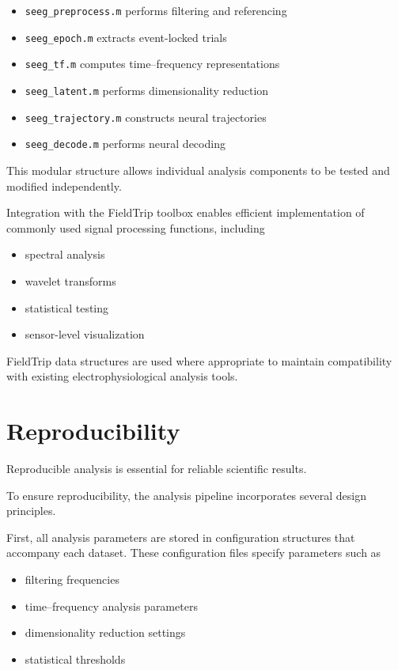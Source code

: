 \documentclass[11pt]{report}
\begin{document}
\begin{itemize}
\item \texttt{seeg\_preprocess.m} performs filtering and referencing
\item \texttt{seeg\_epoch.m} extracts event-locked trials
\item \texttt{seeg\_tf.m} computes time--frequency representations
\item \texttt{seeg\_latent.m} performs dimensionality reduction
\item \texttt{seeg\_trajectory.m} constructs neural trajectories
\item \texttt{seeg\_decode.m} performs neural decoding
\end{itemize}

This modular structure allows individual analysis components
to be tested and modified independently.

Integration with the FieldTrip toolbox enables efficient
implementation of commonly used signal processing functions,
including

\begin{itemize}
\item spectral analysis
\item wavelet transforms
\item statistical testing
\item sensor-level visualization
\end{itemize}

FieldTrip data structures are used where appropriate to maintain
compatibility with existing electrophysiological analysis tools.

\section{Reproducibility}

Reproducible analysis is essential for reliable scientific results.

To ensure reproducibility, the analysis pipeline incorporates
several design principles.

First, all analysis parameters are stored in configuration
structures that accompany each dataset. These configuration
files specify parameters such as

\begin{itemize}
\item filtering frequencies
\item time--frequency analysis parameters
\item dimensionality reduction settings
\item statistical thresholds
\end{itemize}
\end{document}
